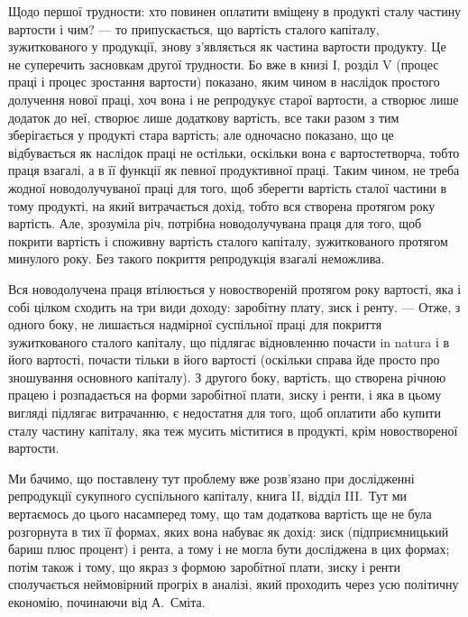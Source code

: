 
Щодо першої трудности: хто повинен оплатити вміщену в продукті сталу
частину вартости і чим? — то припускається, що вартість сталого капіталу, зужиткованого у продукції,
знову з’являється як частина вартости продукту. Це не
суперечить засновкам другої трудности. Бо вже в книзі І, розділ  V (процес праці і
процес зростання вартости) показано, яким чином в наслідок простого долучення
нової праці, хоч вона і не репродукує старої вартости, а створює лише додаток
до неї, створює лише додаткову вартість, все таки разом з тим зберігається
у продукті стара вартість; але одночасно показано, що це відбувається як наслідок
праці не остільки, оскільки вона є вартостетворча, тобто праця взагалі, а в її
функції як певної продуктивної праці. Таким чином, не треба жодної новодолучуваної
праці для того, щоб зберегти вартість сталої частини в тому продукті,
на який витрачається дохід, тобто вся створена протягом року вартість. Але,
зрозуміла річ, потрібна новодолучувана праця для того, щоб покрити вартість
і споживну вартість сталого капіталу, зужиткованого протягом минулого
року. Без такого покриття репродукція взагалі неможлива.

Вся новодолучена праця втілюється у новоствореній протягом року вартості,
яка і собі цілком сходить на три види доходу: заробітну плату,
зиск і ренту. — Отже, з одного боку, не лишається надмірної суспільної праці
для покриття зужиткованого сталого капіталу, що підлягає відновленню почасти
in natura і в його вартості, почасти тільки в його вартості (оскільки справа
йде просто про зношування основного капіталу). З другого боку, вартість, що
створена річною працею і розпадається на форми заробітної плати, зиску і ренти,
і яка в цьому вигляді підлягає витрачанню, є недостатня для того, щоб оплатити
або купити сталу частину капіталу, яка теж мусить міститися в продукті,
крім новоствореної вартости.

Ми бачимо, що поставлену тут проблему вже розв’язано при дослідженні
репродукції сукупного суспільного капіталу, книга II, відділ III.~Тут ми вертаємось
до цього насамперед тому, що там додаткова вартість ще не була розгорнута
в тих її формах, яких вона набуває як дохід: зиск (підприємницький
бариш плюс процент) і рента, а тому і не могла бути досліджена в цих формах; потім також і тому, що
якраз з формою заробітної плати, зиску і ренти
сполучається неймовірний прогріх в аналізі, який проходить через усю політичну
економію, починаючи від А.~Сміта.

